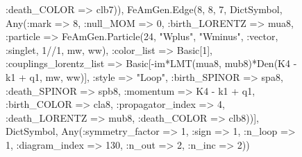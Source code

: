 \documentclass{revtex4}
\begin{document}
\begin{figure}[!htb]
\begin{center}
{:death_COLOR => clb7)), FeAmGen.Edge(8, 8, 7, Dict{Symbol, Any}(:mark => 8, :null_MOM => 0, :birth_LORENTZ => mua8, :particle => FeAmGen.Particle(24, "Wplus", "Wminus", :vector, :singlet, 1//1, mw, ww), :color_list => Basic[1], :couplings_lorentz_list => Basic[-im*LMT(mua8, mub8)*Den(K4 - k1 + q1, mw, ww)], :style => "Loop", :birth_SPINOR => spa8, :death_SPINOR => spb8, :momentum => K4 - k1 + q1, :birth_COLOR => cla8, :propagator_index => 4, :death_LORENTZ => mub8, :death_COLOR => clb8))], Dict{Symbol, Any}(:symmetry_factor => 1, :sign => 1, :n_loop => 1, :diagram_index => 130, :n_out => 2, :n_inc => 2)) 
}
\end{center}
\end{figure}
\end{document}
